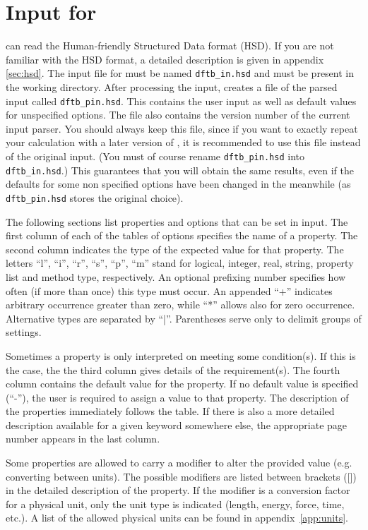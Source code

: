 \chapter{Input for {\dftbp}}


{\dftbp} can read the Human-friendly Structured Data format (HSD).  If you are
not familiar with the HSD format, a detailed description is given in appendix
\ref{sec:hsd}. The input file for {\dftbp} must be named \verb|dftb_in.hsd| and
must be present in the working directory. After processing the input, {\dftbp}
creates a file of the parsed input called \verb|dftb_pin.hsd|. This contains the
user input as well as default values for unspecified options.  The file also
contains the version number of the current input parser.  You should always keep
this file, since if you want to exactly repeat your calculation with a later
version of \dftbp{}, it is recommended to use this file instead of the original
input. (You must of course rename \verb|dftb_pin.hsd| into \verb|dftb_in.hsd|.)
This guarantees that you will obtain the same results, even if the defaults for
some non specified options have been changed in the meanwhile (as
\verb|dftb_pin.hsd| stores the original choice).

The following sections list properties and options that can be set in
{\dftbp} input. The first column of each of the tables of options
specifies the name of a property. The second column indicates the type
of the expected value for that property.  The letters ``l'', ``i'',
``r'', ``s'', ``p'', ``m'' stand for logical, integer, real, string,
property list and method type, respectively. An optional prefixing
number specifies how often (if more than once) this type must occur.
An appended ``+'' indicates arbitrary occurrence greater than zero,
while ``*'' allows also for zero occurrence.  Alternative types are
separated by ``|''.  Parentheses serve only to delimit groups of
settings.

Sometimes a property is only interpreted on meeting some condition(s).  If this
is the case, the the third column gives details of the requirement(s). The
fourth column contains the default value for the property.  If no default value
is specified (``-''), the user is required to assign a value to that property.
The description of the properties immediately follows the table.  If there is
also a more detailed description available for a given keyword somewhere else,
the appropriate page number appears in the last column.

Some properties are allowed to carry a modifier to alter the provided
value (e.g. converting between units). The possible modifiers are
listed between brackets ([]) in the detailed description of the
property. If the modifier is a conversion factor for a physical unit,
only the unit type is indicated (length, energy, force, time, etc.). A
list of the allowed physical units can be found in
appendix~\ref{app:units}.

